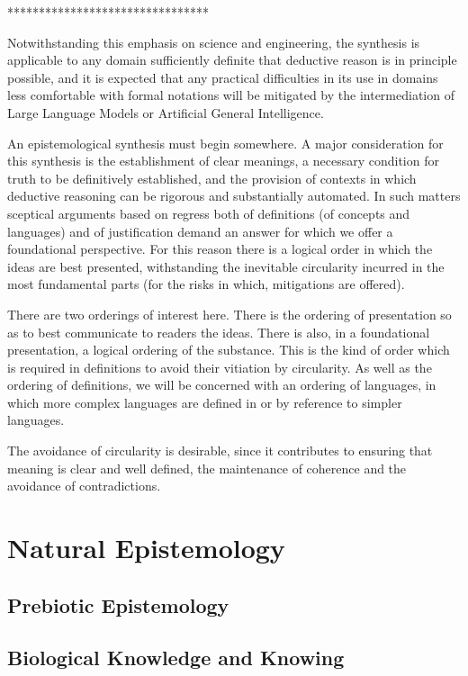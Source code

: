 \documentclass[10pt,titlepage]{book}
\begin{document}
********************************

Notwithstanding this emphasis on science and engineering, the synthesis is applicable to any domain sufficiently definite that deductive reason is in principle possible, and it is expected that any practical difficulties in its use in domains less comfortable with formal notations will be mitigated by the intermediation of Large Language Models or Artificial General Intelligence.

An epistemological synthesis must begin somewhere.
A major consideration for this synthesis is the establishment of clear meanings, a necessary condition for truth to be definitively established, and the provision of contexts in which deductive reasoning can be rigorous and substantially automated.
In such matters sceptical arguments based on regress both of definitions (of concepts and languages) and of justification demand an answer for which we offer a foundational perspective.
For this reason there is a logical order in which the ideas are best presented, withstanding the inevitable circularity incurred in the most fundamental parts (for the risks in which, mitigations are offered).

There are two orderings of interest here.
There is the ordering of presentation so as to best communicate to readers the ideas.
There is also, in a foundational presentation, a logical ordering of the substance.
This is the kind of order which is required in definitions to avoid their vitiation by circularity.
As well as the ordering of definitions, we will be concerned with an ordering of languages, in which more complex languages are defined in or by reference to simpler languages.

The avoidance of circularity is desirable, since it contributes to ensuring that meaning is clear and well defined, the maintenance of coherence and the avoidance of contradictions.

\part{Natural Epistemology}

\chapter{Prebiotic Epistemology}

\chapter{Biological Knowledge and Knowing}
\end{document}
